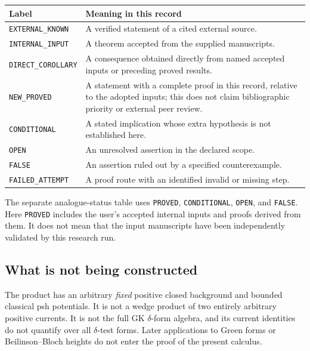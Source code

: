 \documentclass[11pt,a4paper]{article}
\numberwithin{equation}{section}
\theoremstyle{definition}
\theoremstyle{remark}
\begin{document}
\begin{center}
\begin{tabularx}{\textwidth}{@{}lX@{}}
\toprule
Label & Meaning in this record\\
\midrule
\texttt{EXTERNAL\_KNOWN} & A verified statement of a cited external source.\\
\texttt{INTERNAL\_INPUT} & A theorem accepted from the supplied manuscripts.\\
\texttt{DIRECT\_COROLLARY} & A consequence obtained directly from named accepted inputs or preceding proved results.\\
\texttt{NEW\_PROVED} & A statement with a complete proof in this record, relative to the adopted inputs; this does not claim bibliographic priority or external peer review.\\
\texttt{CONDITIONAL} & A stated implication whose extra hypothesis is not established here.\\
\texttt{OPEN} & An unresolved assertion in the declared scope.\\
\texttt{FALSE} & An assertion ruled out by a specified counterexample.\\
\texttt{FAILED\_ATTEMPT} & A proof route with an identified invalid or missing step.\\
\bottomrule
\end{tabularx}
\end{center}

The separate analogue-status table uses \texttt{PROVED},
\texttt{CONDITIONAL}, \texttt{OPEN}, and \texttt{FALSE}.
Here \texttt{PROVED} includes the user's accepted internal inputs and
proofs derived from them. It does not mean that the input manuscripts
have been independently validated by this research run.

\subsection{What is not being constructed}

The product has an arbitrary \emph{fixed} positive closed background
and bounded classical psh potentials. It is not a wedge product of two
entirely arbitrary positive currents. It is not the full GK
$\delta$-form algebra, and its current identities do not quantify over
all $\delta$-test forms. Later applications to Green forms or
Beilinson--Bloch heights do not enter the proof of the present calculus.

\end{document}
